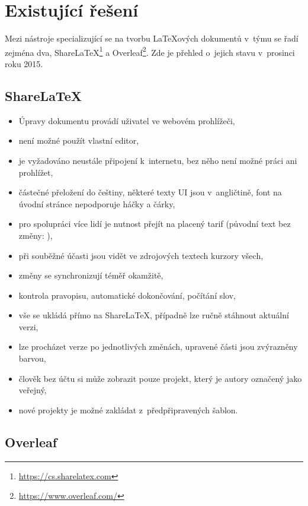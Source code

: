 \section{Existující řešení}

Mezi nástroje specializující se na tvorbu \LaTeX{ových} dokumentů v~týmu se řadí zejména dva, ShareLaTeX\footnote{\url{https://cs.sharelatex.com}} a Overleaf\footnote{\url{https://www.overleaf.com/}}. Zde je přehled o~jejich stavu v~prosinci roku 2015.

\subsection{ShareLaTeX}

\begin{itemize}
	\item Úpravy dokumentu provádí uživatel ve webovém prohlížeči,
	\item není možné použít vlastní editor,
	\item je vyžadováno neustále připojení k~internetu, bez něho není možné práci ani prohlížet,
	\item částečné přeložení do češtiny, některé texty UI jsou v~angličtině, font na úvodní stránce nepodporuje háčky a čárky,
	\item pro spolupráci více lidí je nutnost přejít na placený tarif (původní text bez změny:  \cite{sharelatex-pricing}),
	\item při souběžné účasti jsou vidět ve zdrojových textech kurzory všech,
	\item změny se synchronizují téměř okamžitě,
	\item kontrola pravopisu, automatické dokončování, počítání slov,
	\item vše se ukládá přímo na ShareLaTeX, případně lze ručně stáhnout aktuální verzi,
	\item lze procházet verze po jednotlivých změnách, upravené části jsou zvýrazněny barvou,
	\item člověk bez účtu si může zobrazit pouze projekt, který je autory označený jako veřejný,
	\item nové projekty je možné zakládat z~předpřipravených šablon.
\end{itemize}


\subsection{Overleaf}

